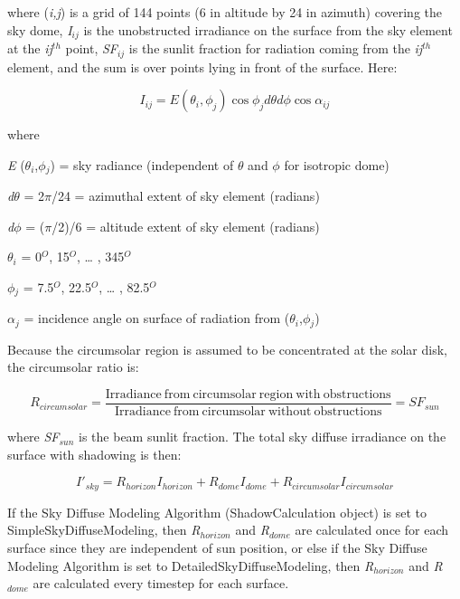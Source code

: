 where (\emph{i,j}) is a grid of 144 points (6 in altitude by 24 in azimuth) covering the sky dome, \emph{I\(_{ij}\)} is the unobstructed irradiance on the surface from the sky element at the \emph{ij}\(^{th}\) point, \emph{SF\(_{ij}\)} is the sunlit fraction for radiation coming from the \emph{ij}\(^{th}\) element, and the sum is over points lying in front of the surface. Here:

\begin{equation}
{I_{ij}} = E({\theta_i},{\phi_j})\cos {\phi_j}d\theta d\phi \cos {\alpha_{ij}}
\end{equation}

where

\emph{E} (\emph{$\theta$\(_{i}\)},\emph{$\phi$\(_{j}\)}) = sky radiance (independent of $\theta$ and $\phi$ for isotropic dome)

\emph{d$\theta$} = 2$\pi$/24 = azimuthal extent of sky element (radians)

\emph{d$\phi$} = ($\pi$/2)/6 = altitude extent of sky element (radians)

\emph{$\theta$\(_{i}\)} = 0\(^{O}\), 15\(^{O}\), \ldots{} , 345\(^{O}\)

\emph{$\phi$\(_{j}\)} = 7.5\(^{O}\), 22.5\(^{O}\), \ldots{} , 82.5\(^{O}\)

$\alpha$\(_{j}\) = incidence angle on surface of radiation from (\emph{$\theta$\(_{i}\)},\emph{$\phi$\(_{j}\)})

Because the circumsolar region is assumed to be concentrated at the solar disk, the circumsolar ratio is:

\begin{equation}
{R_{circumsolar}} = \frac{{{\mathrm{Irradiance~from~circumsolar~region~with~obstructions}}}}{{{\mathrm{Irradiance~from~circumsolar~without~obstructions}}}} = S{F_{sun}}
\end{equation}

where \emph{SF\(_{sun}\)} is the beam sunlit fraction. The total sky diffuse irradiance on the surface with shadowing is then:

\begin{equation}
{I'_{sky}} = {R_{horizon}}{I_{horizon}} + {R_{dome}}{I_{dome}} + {R_{circumsolar}}{I_{circumsolar}}
\end{equation}

If the Sky Diffuse Modeling Algorithm (ShadowCalculation object) is set to SimpleSkyDiffuseModeling, then \emph{R\(_{horizon}\)} and \emph{R\(_{dome}\)} are calculated once for each surface since they are independent of sun position, or else if the Sky Diffuse Modeling Algorithm is set to DetailedSkyDiffuseModeling, then \emph{R\(_{horizon}\)} and \emph{R\(_{dome}\)} are calculated every timestep for each surface.

